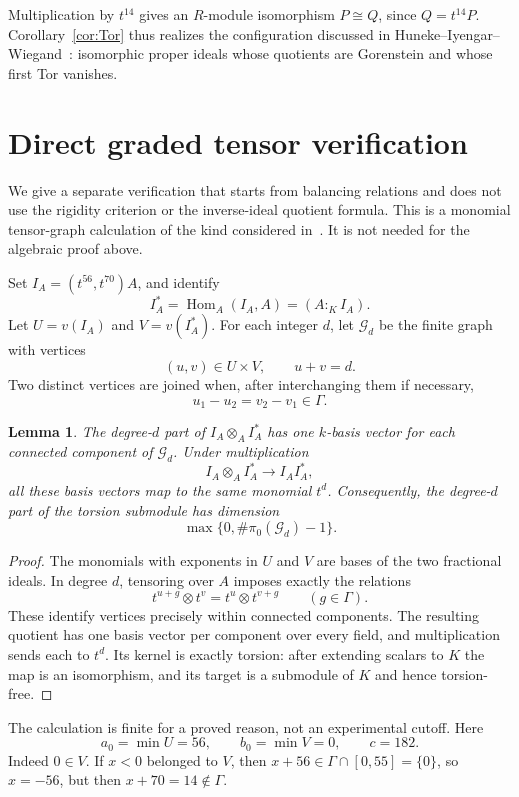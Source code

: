 \documentclass[11pt,letterpaper]{article}
\newtheorem{lemma}[theorem]{Lemma}
\theoremstyle{remark}
\newcommand{\Hom}{\operatorname{Hom}}
\numberwithin{equation}{section}
\begin{document}
Multiplication by $t^{14}$ gives an $R$-module isomorphism $P\cong Q$, since $Q=t^{14}P$. Corollary~\ref{cor:Tor} thus realizes the configuration discussed in Huneke--Iyengar--Wiegand~\cite[Remark~5.8]{HIW}: isomorphic proper ideals whose quotients are Gorenstein and whose first Tor vanishes.

\section{Direct graded tensor verification}\label{sec:graphs}
We give a separate verification that starts from balancing relations and does not use the rigidity criterion or the inverse-ideal quotient formula. This is a monomial tensor-graph calculation of the kind considered in~\cite{Leamer}. It is not needed for the algebraic proof above.

Set $I_A=(t^{56},t^{70})A$, and identify
\[
 I_A^*=\Hom_A(I_A,A)=(A:_K I_A).
\]
Let $U=v(I_A)$ and $V=v(I_A^*)$. For each integer $d$, let $\mathcal G_d$ be the finite graph with vertices
\[
 (u,v)\in U\times V,\qquad u+v=d.
\]
Two distinct vertices are joined when, after interchanging them if necessary,
\[
 u_1-u_2=v_2-v_1\in\Gamma.
\]

\begin{lemma}\label{lem:graph}
The degree-$d$ part of $I_A\otimes_A I_A^*$ has one $k$-basis vector for each connected component of $\mathcal G_d$. Under multiplication
\[
 I_A\otimes_A I_A^*\longrightarrow I_AI_A^*,
\]
all these basis vectors map to the same monomial $t^d$. Consequently, the degree-$d$ part of the torsion submodule has dimension
\[
 \max\{0,\#\pi_0(\mathcal G_d)-1\}.
\]
\end{lemma}
\begin{proof}
The monomials with exponents in $U$ and $V$ are bases of the two fractional ideals. In degree $d$, tensoring over $A$ imposes exactly the relations
\[
 t^{u+g}\otimes t^v=t^u\otimes t^{v+g}\qquad(g\in\Gamma).
\]
These identify vertices precisely within connected components. The resulting quotient has one basis vector per component over every field, and multiplication sends each to $t^d$. Its kernel is exactly torsion: after extending scalars to $K$ the map is an isomorphism, and its target is a submodule of $K$ and hence torsion-free.
\end{proof}

The calculation is finite for a proved reason, not an experimental cutoff. Here
\[
 a_0=\min U=56,\qquad b_0=\min V=0,\qquad c=182.
\]
Indeed $0\in V$. If $x<0$ belonged to $V$, then $x+56\in\Gamma\cap[0,55]=\{0\}$, so $x=-56$, but then $x+70=14\notin\Gamma$.
\end{document}
